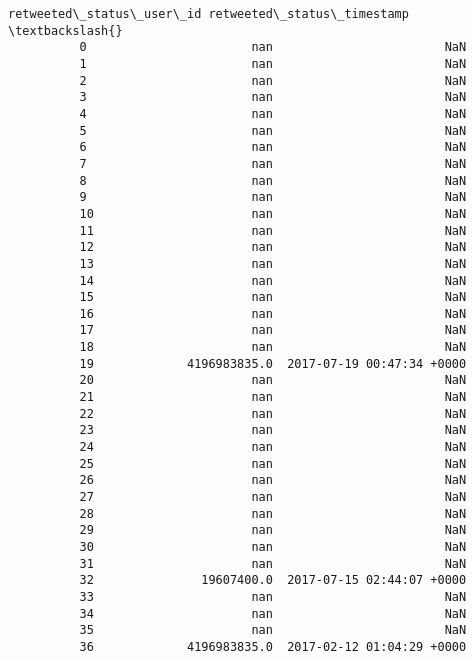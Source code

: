 \documentclass[11pt]{article}
\begin{document}
\begin{Verbatim}[commandchars=\\\{\}]
             retweeted\_status\_user\_id retweeted\_status\_timestamp  \textbackslash{}
          0                       nan                        NaN   
          1                       nan                        NaN   
          2                       nan                        NaN   
          3                       nan                        NaN   
          4                       nan                        NaN   
          5                       nan                        NaN   
          6                       nan                        NaN   
          7                       nan                        NaN   
          8                       nan                        NaN   
          9                       nan                        NaN   
          10                      nan                        NaN   
          11                      nan                        NaN   
          12                      nan                        NaN   
          13                      nan                        NaN   
          14                      nan                        NaN   
          15                      nan                        NaN   
          16                      nan                        NaN   
          17                      nan                        NaN   
          18                      nan                        NaN   
          19             4196983835.0  2017-07-19 00:47:34 +0000   
          20                      nan                        NaN   
          21                      nan                        NaN   
          22                      nan                        NaN   
          23                      nan                        NaN   
          24                      nan                        NaN   
          25                      nan                        NaN   
          26                      nan                        NaN   
          27                      nan                        NaN   
          28                      nan                        NaN   
          29                      nan                        NaN   
          30                      nan                        NaN   
          31                      nan                        NaN   
          32               19607400.0  2017-07-15 02:44:07 +0000   
          33                      nan                        NaN   
          34                      nan                        NaN   
          35                      nan                        NaN   
          36             4196983835.0  2017-02-12 01:04:29 +0000   

\end{Verbatim}
\end{document}
